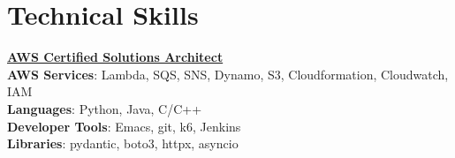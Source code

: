 \documentclass[letterpaper,11pt]{article}
\begin{document}
\section{Technical Skills}
 \begin{itemize}[leftmargin=0.15in, label={}]
    \small{\item{
     \textbf{\href{https://www.credly.com/badges/6cfa3e1d-b75e-4a53-a16b-acdf66ca04e3?source=linked_in_profile}{AWS Certified Solutions Architect}} \\
     \textbf{AWS Services}{: Lambda, SQS, SNS, Dynamo, S3, Cloudformation, Cloudwatch, IAM } \\
     \textbf{Languages}{: Python, Java, C/C++ } \\
     \textbf{Developer Tools}{: Emacs, git, k6, Jenkins } \\
     \textbf{Libraries}{: pydantic, boto3, httpx, asyncio } \\
    }}
 \end{itemize}
\end{document}

